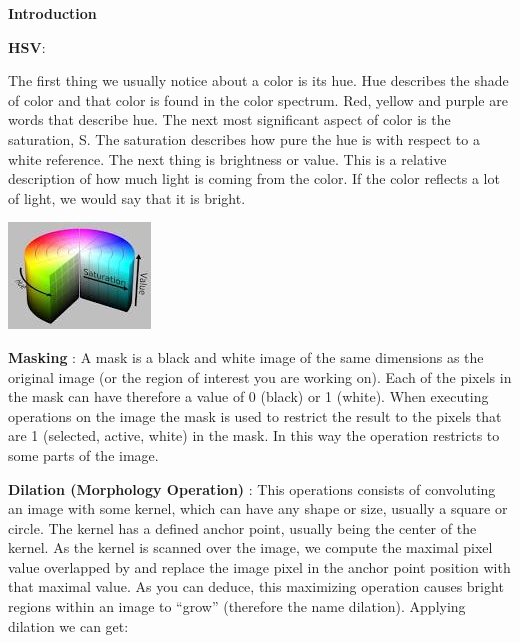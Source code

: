 \documentclass[report]{res}
\begin{document}
	\pagebreak
	
	
	\begin{center}
		\textbf{\huge Introduction} \\
	\end{center}
	
	\textbf{HSV}:
	
	The first thing we usually notice about a color is its hue. Hue describes the shade of color and that color is found in the color spectrum. Red, yellow and purple are words that describe hue. The next most significant aspect of color is the saturation, S. The saturation describes how pure the hue is with respect to a white reference. The next thing is brightness or value. This is a relative description of how much light is coming from the color. If the color reflects a lot of light, we would say that it is bright.\\
	
	\begin{center}
		\includegraphics{graphics/hsv.jpg}
	\end{center}
	
	\textbf{Masking }:
	A mask is a black and white image of the same dimensions as the original image (or the region of interest you are working on). Each of the pixels in the mask can have therefore a value of 0 (black) or 1 (white). 
	When executing operations on the image the mask is used to restrict the result to the pixels that are 1 (selected, active, white) in the mask. In this way the operation restricts to some parts of the image.
	
	\textbf{Dilation (Morphology Operation) } :
	This operations consists of convoluting an image with some kernel, which can have any shape or size, usually a square or circle. The kernel has a defined anchor point, usually being the center of the kernel. As the kernel is scanned over the image, we compute the maximal pixel value overlapped by and replace the image pixel in the anchor point position with that maximal value. As you can deduce, this maximizing operation causes bright regions within an image to “grow” (therefore the name dilation). Applying dilation we can get:\\	
	
\end{document}
